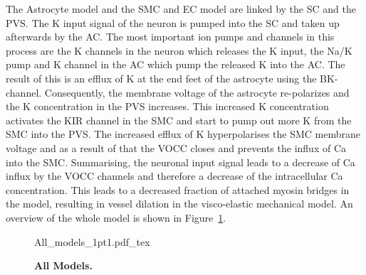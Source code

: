 The Astrocyte model and the \gls{SMC} and \gls{EC} model are linked by the SC and the \gls{PVS}. The \gls{K} input signal of the neuron is pumped into the \gls{SC} and taken up afterwards by the AC. The most important ion pumps and channels in this process are the \gls{K} channels in the neuron which releases the \gls{K} input,  the \gls{Na}/\gls{K} pump and \gls{K} channel in the \gls{AC} which pump the released \gls{K} into the AC.
The result of this is an efflux of \gls{K} at the end feet of the astrocyte using the BK-channel. Consequently, the membrane voltage of the astrocyte re-polarizes and the \gls{K} concentration in the PVS increases. This increased \gls{K} concentration activates the KIR channel in the \gls{SMC} and start to pump out more \gls{K} from the \gls{SMC} into the \gls{PVS}. The increased efflux of \gls{K} hyperpolarises the \gls{SMC} membrane voltage and as a result of that the VOCC closes and prevents the influx of \gls{Ca} into the \gls{SMC}.
Summarising, the neuronal input signal leads to a decrease of \gls{Ca} influx by the VOCC channels and therefore a decrease of the intracellular \gls{Ca} concentration. This leads to a decreased fraction of attached myosin bridges in the \citet{Hai1989} model, resulting in vessel dilation in the visco-elastic mechanical model. An overview of the whole model is shown in Figure~\ref{Overview}.

\begin{figure}[h!]
  \centering
  \def\svgwidth{450pt}
  \scriptsize 
  {All_models_1pt1.pdf_tex}
  \caption{\textbf{All Models.}}
\label{Overview}
\end{figure}







